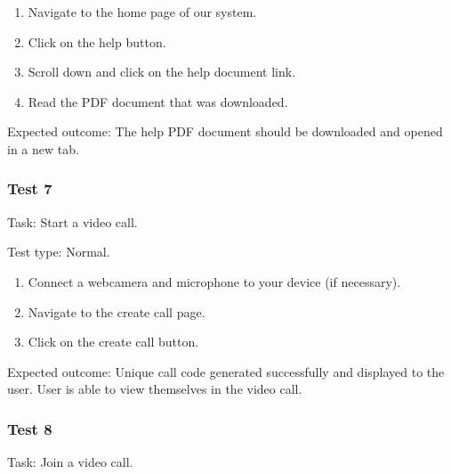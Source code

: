 \begin{enumerate}
  \item Navigate to the home page of our system.
  \item Click on the help button.
  \item Scroll down and click on the help document link.
  \item Read the PDF document that was downloaded.
\end{enumerate}

{\sffamily Expected outcome:} The help PDF document should
be downloaded and opened in a new tab. \\

{\color{gray} \hrulefill}

\vspace{0.2cm}


\subsubsection{Test 7}

{\sffamily Task:} Start a video call.\\ 

{\color{gray} \hrulefill}

{\sffamily Test type: Normal.}\\

\begin{enumerate}
  \item Connect a webcamera and microphone to your device (if necessary).
  \item Navigate to the create call page.
  \item Click on the create call button.
\end{enumerate}

{\sffamily Expected outcome:} Unique call code generated successfully 
and displayed to the user. User is able to view themselves in 
the video call.\\

{\color{gray} \hrulefill}

\vspace{0.2cm}

\subsubsection{Test 8}

{\sffamily Task:} Join a video call.\\ \vspace{0.2cm}

